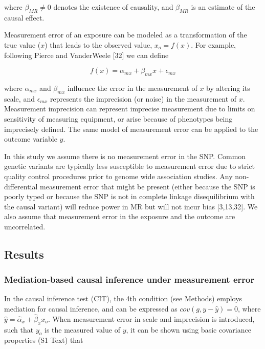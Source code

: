 \documentclass[]{article}
\begin{document}
where \(\beta_{MR} \neq 0\) denotes the existence of causality, and
\(\beta_{MR}\) is an estimate of the causal effect.

Measurement error of an exposure can be modeled as a transformation of
the true value (\(x\)) that leads to the observed value, \(x_o = f(x)\).
For example, following Pierce and VanderWeele {[}32{]} we can define

\[
f(x) = \alpha_{mx} + \beta_{mx} x + \epsilon_{mx}
\]

where \(\alpha_{mx}\) and \(\beta_{mx}\) influence the error in the
measurement of \(x\) by altering its scale, and \(\epsilon_{mx}\)
represents the imprecision (or noise) in the measurement of \(x\).
Measurement imprecision can represent imprecise measurement due to
limits on sensitivity of measuring equipment, or arise because of
phenotypes being imprecisely defined. The same model of measurement
error can be applied to the outcome variable \(y\).

In this study we assume there is no measurement error in the SNP. Common
genetic variants are typically less susceptible to measurement error due
to strict quality control procedures prior to genome wide association
studies. Any non-differential measurement error that might be present
(either because the SNP is poorly typed or because the SNP is not in
complete linkage disequilibrium with the causal variant) will reduce
power in MR but will not incur bias {[}3,13,32{]}. We also assume that
measurement error in the exposure and the outcome are uncorrelated.

\hypertarget{results}{%
\subsection{Results}\label{results}}

\hypertarget{mediation-based-causal-inference-under-measurement-error}{%
\subsubsection{Mediation-based causal inference under measurement
error}\label{mediation-based-causal-inference-under-measurement-error}}

In the causal inference test (CIT), the 4th condition (see Methods)
employs mediation for causal inference, and can be expressed as
\(cov(g, y - \hat{y}) = 0\), where
\(\hat{y} = \hat{\alpha}_x + \hat{\beta}_x x_o\). When measurement error
in scale and imprecision is introduced, such that \(y_o\) is the
measured value of \(y\), it can be shown using basic covariance
properties (S1 Text) that
\end{document}
